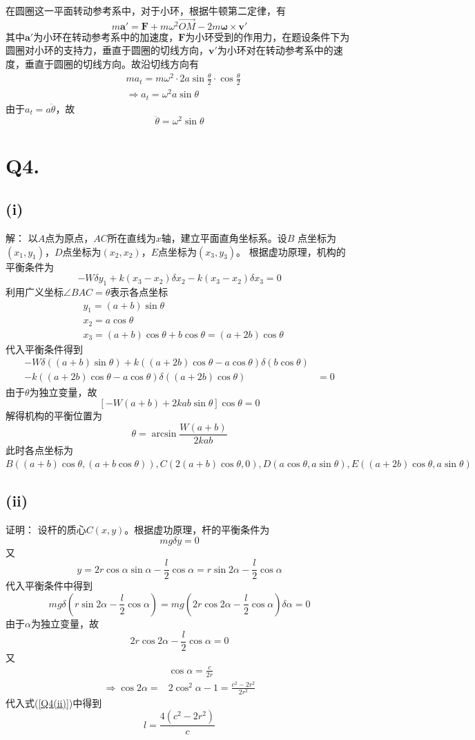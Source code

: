 \documentclass[10pt,a4paper]{article}
\begin{document}
在圆圈这一平面转动参考系中，对于小环，根据牛顿第二定律，有
\[
m\bm{a}' = \bm{F} + m\omega^2\overrightarrow{OM} - 2m\bm{\omega}\times\bm{v}'
\]
其中$\bm{a}'$为小环在转动参考系中的加速度，$\bm{F}$为小环受到的作用力，在题设条件下为圆圈对小环的支持力，垂直于圆圈的切线方向，$\bm{v}'$为小环对在转动参考系中的速度，垂直于圆圈的切线方向。故沿切线方向有
\begin{align*}
&ma_t = m\omega^2\cdot2a\sin\frac{\theta}{2}\cdot\cos\frac{\theta}{2}\\
&\Longrightarrow a_t = \omega^2a\sin\theta
\end{align*}
由于$a_t = a\ddot{\theta}$，故
\[
\ddot{\theta} = \omega^2\sin\theta
\]
\section*{Q4.}
\subsection*{(i)}解：
以$A$点为原点，$AC$所在直线为$x$轴，建立平面直角坐标系。设$B$ 点坐标为$(x_1,y_1)$，$D$点坐标为$(x_2,x_2)$，$E$点坐标为$(x_3,y_3)$。 根据虚功原理，机构的平衡条件为
\[
-W\delta y_1 + k(x_3 - x_2)\delta x_2 - k(x_3 - x_2)\delta x_3 = 0
\]
利用广义坐标$\angle BAC = \theta$表示各点坐标
\begin{align*}
&y_1 = (a + b)\sin\theta\\
&x_2 = a\cos\theta\\
&x_3 = (a + b)\cos\theta + b\cos\theta = (a + 2b)\cos\theta
\end{align*}
代入平衡条件得到
\begin{align*}
-W\delta((a + b)\sin\theta) + k((a + 2b)\cos\theta - a\cos\theta)\delta (b\cos\theta)&\\
- k((a + 2b)\cos\theta - a\cos\theta)\delta((a + 2b)\cos\theta)& = 0
\end{align*}
由于$\theta$为独立变量，故
\[
[-W(a + b) + 2kab\sin\theta]\cos\theta = 0
\]
解得机构的平衡位置为
\[
\theta = \arcsin\frac{W(a + b)}{2kab}
\]
此时各点坐标为$B((a + b)\cos\theta,(a + b\cos\theta)),C(2(a + b)\cos\theta,0),D(a\cos\theta,a\sin\theta),E((a + 2b)\cos\theta,a\sin\theta)$
\subsection*{(ii)}证明：
设杆的质心$C(x,y)$。根据虚功原理，杆的平衡条件为
\[
mg\delta y = 0
\]
又
\[
y = 2r\cos\alpha\sin\alpha - \frac{l}{2}\cos\alpha = r\sin2\alpha - \frac{l}{2}\cos\alpha
\]
代入平衡条件中得到
\[
mg\delta(r\sin2\alpha - \frac{l}{2}\cos\alpha) = mg(2r\cos2\alpha - \frac{l}{2}\cos\alpha)\delta\alpha = 0
\]
由于$\alpha$为独立变量，故
\begin{equation}
\label{Q4(ii)}
2r\cos2\alpha - \frac{l}{2}\cos\alpha = 0
\end{equation}
又
\begin{align*}
&\cos\alpha = \frac{c}{2r}\\
\Longrightarrow\cos2\alpha =& 2\cos^2\alpha - 1 = \frac{c^2 - 2r^2}{2r^2}
\end{align*}
代入式(\ref{Q4(ii)})中得到
\[
l = \frac{4(c^2 - 2r^2)}{c}
\]
\end{document}
